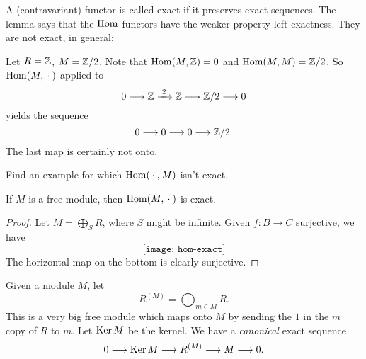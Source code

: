 A (contravariant) functor is called exact if it preserves exact
sequences. The lemma says that the \(\operatorname{Hom}\) functors have the weaker
property left exactness. They are not exact, in general:

\begin{example}
  Let \(R=\mathbb{Z}\), \(M=\mathbb{Z}/2\). Note that \(\operatorname{Hom}(M,\mathbb{Z})=0\) and
  \(\operatorname{Hom}(M,M)=\mathbb{Z}/2\). So \(\operatorname{Hom}(M,{}\cdot{})\) applied to
  \[0\longrightarrow\mathbb{Z}\xrightarrow{\,\,2\,\,}\mathbb{Z}\longrightarrow\mathbb{Z}/2\longrightarrow 0\]
  yields the sequence
  \[0\longrightarrow 0\longrightarrow 0\longrightarrow\mathbb{Z}/2.\]
  The last map is certainly not onto.
\end{example}

\begin{exercise}
  Find an example for which \(\operatorname{Hom}({}\cdot{},M)\) isn't exact.
\end{exercise}

\begin{lemma}
  If \(M\) is a free module, then \(\operatorname{Hom}(M,{}\cdot{})\) is exact.
\end{lemma}
\begin{proof}
  Let \(M=\bigoplus_S R\), where \(S\) might be infinite. Given \(f\colon
  B\to C\) surjective, we have
  \[
    \texttt{[image: hom-exact]}
  \]
  The horizontal map on the bottom is clearly surjective.
\end{proof}

Given a module \(M\), let
\[
  R^{(M)}=\bigoplus_{m\in M} R.
\]
This is a very big free module which maps onto \(M\) by sending the \(1\)
in the \(m\) copy of \(R\) to \(m\). Let \(\operatorname{Ker} M\) be the
kernel. We have a \emph{canonical} exact sequence
\begin{equation}
  \label{eq:alggeom:canonical-exact-seq}
  0\longrightarrow\operatorname{Ker} M\longrightarrow R^{(M)}\longrightarrow M\longrightarrow 0.
\end{equation}

